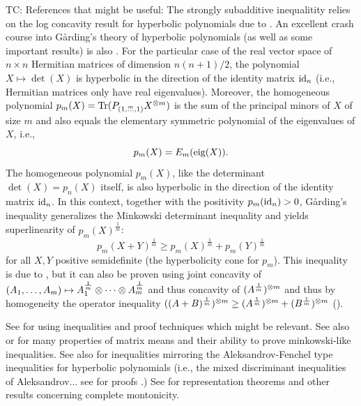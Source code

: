 \documentclass[notitlepage, 10pt]{article}
\begin{document}
{\color{green!60!black}
TC: References that might be useful:
The strongly subadditive inequalitity relies on the log concavity result for hyperbolic polynomials due to \citeauthor{bauschke2001hyperbolic} \cite{bauschke2001hyperbolic}.
An excellent crash course into Gårding's theory of hyperbolic polynomials (as well as some important results) is also \cite{bauschke2001hyperbolic}.
For the particular case of the real vector space of $n\times n$ Hermitian matrices of dimension $n(n+1)/2$, the polynomial $X \mapsto \det(X)$ is hyperbolic in the direction of the identity matrix $\operatorname{id}_n$ (i.e., Hermitian matrices only have real eigenvalues).
Moreover, the homogeneous polynomial $p_m(X) = \operatorname{Tr}(P_{(1,\stackrel{m}{\ldots}, 1)}X^{\otimes m})$ is the sum of the principal minors of $X$ of size $m$ and also equals the elementary symmetric polynomial of the eigenvalues of $X$, i.e.,
\begin{equation}
    p_m(X) = E_m (\operatorname{eig}(X)).
\end{equation}
The homogeneous polynomial $p_m(X)$, like the determinant $\det(X) = p_n(X)$ itself, is also hyperbolic in the direction of the identity matrix $\operatorname{id}_n$.
In this context, together with the positivity $p_m(\operatorname{id}_n) > 0$, Gårding's inequality generalizes the Minkowski determinant inequality and yields superlinearity of $p_m(X)^{\frac{1}{m}}$:
\begin{equation}
    p_{m}(X+Y)^{\frac{1}{m}} \geq p_m(X)^{\frac{1}{m}} + p_m(Y)^{\frac{1}{m}}
\end{equation}
for all $X,Y$ positive semidefinite (the hyperbolicity cone for $p_m$).
This inequality is due to \citeauthor{marcus1957inequalities} \cite[Theorem 2]{marcus1957inequalities},
but it can also be proven using joint concavity of $(A_1,\ldots, A_m)\mapsto A_1^{\frac{1}{m}}\otimes \cdots \otimes A_m^{\frac{1}{m}}$ and thus concavity of $(A^{\frac{1}{m}})^{\otimes m}$ and thus by homogeneity the operator inequality $((A+B)^{\frac{1}{m}})^{\otimes m} \geq (A^{\frac{1}{m}})^{\otimes m} + (B^{\frac{1}{m}})^{\otimes m}$ (\cite[Exercise 4.2.9]{bhatia2009positive}).


See \cite{marcus1957inequalities,mcleod1959four,anderson1984symmetric} for using inequalities and proof techniques which might be relevant.
See also \cite{anderson1984symmetric} or \cite[Chapter 4]{bhatia2009positive} for many properties of matrix means and their ability to prove minkowski-like inequalities.
See also \citeauthor{khovanskii1984analogues} \cite{khovanskii1984analogues} for inequalities mirroring the Aleksandrov-Fenchel type inequalities for hyperbolic polynomials (i.e., the mixed discriminant inequalities of Aleksandrov... see \citeauthor{shenfeld2019mixed} for proofs \cite{shenfeld2019mixed}.)
See \cite{kozhasov2019positivity} for representation theorems and other results concerning complete montonicity.
}


\clearpage
\printbibliography
\end{document}
